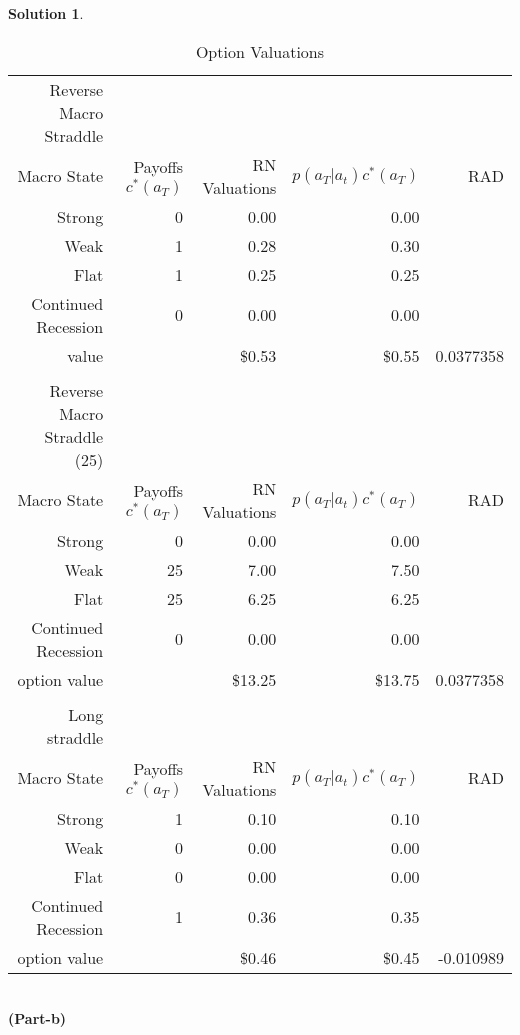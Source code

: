 \documentclass[a4paper, 10pt]{article}
\renewcommand{\arraystretch}{1.4}
\theoremstyle{definition}
\theoremstyle{hSol}
\newtheorem*{solution}{Solution}
\begin{document}
\begin{solution}
\begin{table}[H]
  \centering
  \caption{Option Valuations}
  \vspace{4pt}
  \def\arraystretch{1.15}
    \begin{tabular}{rrrrr}
    \toprule
    Reverse Macro Straddle &   \\
    Macro State & Payoffs $c^*(a_T)$ & RN Valuations & $p(a_T|a_t)c^*(a_T)$ & RAD \\
    \midrule
    Strong & 0     & 0.00  & 0.00  &  \\
    Weak  & 1     & 0.28  & 0.30  &  \\
    Flat  & 1     & 0.25  & 0.25  &  \\
    Continued Recession & 0     & 0.00  & 0.00  &  \\
    \midrule
    value &       & \$0.53 & \$0.55 & 0.0377358 \\
          &       &       &       &  \\
    Reverse Macro Straddle (25)   \\
    Macro State & Payoffs $c^*(a_T)$ & RN Valuations & $p(a_T|a_t)c^*(a_T)$ & RAD \\
    \midrule
    Strong & 0     & 0.00  & 0.00  &  \\
    Weak  & 25    & 7.00  & 7.50  &  \\
    Flat  & 25    & 6.25  & 6.25  &  \\
    Continued Recession & 0     & 0.00  & 0.00  &  \\
    \midrule
    option value &       & \$13.25 & \$13.75 & 0.0377358 \\
          &       &       &       &  \\
    Long straddle  \\
    Macro State & Payoffs $c^*(a_T)$ & RN Valuations & $p(a_T|a_t)c^*(a_T)$ & RAD \\
    \midrule
    Strong & 1     & 0.10  & 0.10  &  \\
    Weak  & 0     & 0.00  & 0.00  &  \\
    Flat  & 0     & 0.00  & 0.00  &  \\
    Continued Recession & 1     & 0.36  & 0.35  &  \\
    \midrule
    option value &       & \$0.46 & \$0.45 & -0.010989 \\
    \bottomrule
    \end{tabular}%
  \label{tab:addlabel}%
\end{table}%
~\\
\textbf{(Part-b)}

\end{solution}
\end{document}
